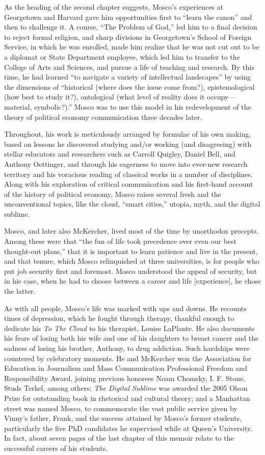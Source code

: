 \documentclass{tufte-handout}
\begin{document}
As the heading of the second chapter suggests, Mosco's experiences at
Georgetown and Harvard gave him opportunities first to ``learn the
canon'' and then to challenge it. A course, ``The Problem of God,'' led
him to a final decision to reject formal religion, and sharp divisions
in Georgetown's School of Foreign Service, in which he was enrolled,
made him realize that he was not cut out to be a diplomat or State
Department employee, which led him to transfer to the College of Arts
and Sciences, and pursue a life of teaching and research. By this time,
he had learned ``to navigate a variety of intellectual landscapes'' by
using the dimensions of ``historical (where does the issue come from?),
epistemological (how best to study it?), ontological (what level of
reality does it occupy---material, symbolic?).'' Mosco was to use this
model in his redevelopment of the theory of political economy
communication three decades later.

Throughout, his work is meticulously arranged by formulae of his own
making, based on lessons he discovered studying and/or working (and
disagreeing) with stellar educators and researchers such as Carroll
Quigley, Daniel Bell, and Anthony Oettinger, and through his eagerness
to move into ever-new research territory and his voracious reading of
classical works in a number of disciplines. Along with his exploration
of critical communication and his first-hand account of the history of
political economy, Mosco raises several fresh and the unconventional
topics, like the cloud, ``smart cities,'' utopia, myth, and the digital
sublime.

Mosco, and later also McKercher, lived most of the time by unorthodox
precepts. Among these were that ``the fun of life took precedence over
even our best thought-out plans,'' that it is important to learn
patience and live in the present, and that tenure, which Mosco
relinquished at three universities, is for people who put job security
first and foremost. Mosco understood the appeal of security, but in his
case, when he had to choose between a career and life {[}experience{]},
he chose the latter.

As with all people, Mosco's life was marked with ups and downs. He
recounts times of depression, which he fought through therapy, thankful
enough to dedicate his \emph{To The Cloud} to his therapist, Louise
LaPlante. He also documents his fears of losing both his wife and one of
his daughters to breast cancer and the sadness of losing his brother,
Anthony, to drug addiction. Such hardships were countered by celebratory
moments. He and McKercher won the Association for Education in
Journalism and Mass Communication Professional Freedom and
Responsibility Award, joining previous honorees Noam Chomsky, I. F.
Stone, Studs Terkel, among others; \emph{The Digital Sublime} was
awarded the 2005 Olson Prize for outstanding book in rhetorical and
cultural theory; and a Manhattan street was named Mosco, to commemorate
the vast public service given by Vinny's father, Frank, and the success
attained by Mosco's former students, particularly the five PhD
candidates he supervised while at Queen's University. In fact, about
seven pages of the last chapter of this memoir relate to the successful
careers of his students.
\end{document}
